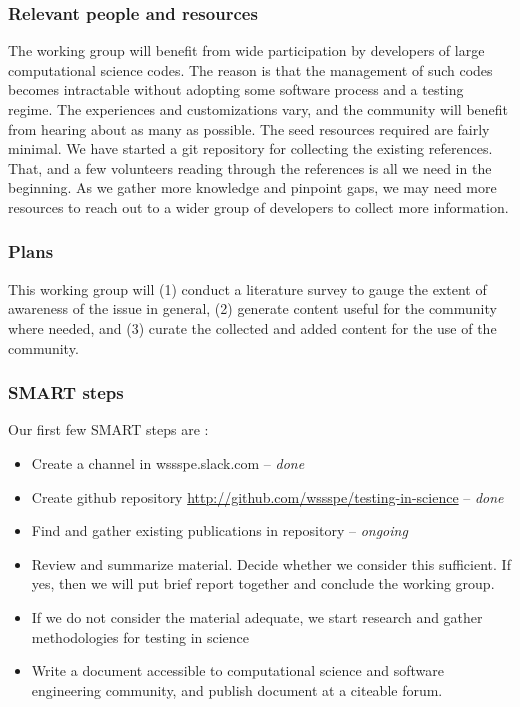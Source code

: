 \subsubsection{Relevant people and resources}

The working group will benefit from wide participation by developers
of large computational science codes. The reason is that the
management of such codes becomes intractable without adopting some
software process and a testing regime. The experiences and
customizations vary, and the community will benefit from hearing about
as many as possible. The seed resources required are fairly
minimal. We have started a git repository for collecting the
existing references. That, and a few volunteers reading through the
references is all we need in the beginning. As we gather more
knowledge and pinpoint gaps, we may need more resources to reach out
to a wider group of developers to collect more information.

\subsubsection{Plans}

This working group will (1) conduct a literature survey to gauge the extent
of awareness of the issue in general, (2) generate content useful for
the community where needed, and (3) curate the collected and added
content for the use of the community.


\subsubsection{SMART steps}

Our first few SMART steps are : 
\begin{itemize}
\item Create a channel in wssspe.slack.com -- {\em done}
\item Create github repository
  {\url{http://github.com/wssspe/testing-in-science}} -- {\em done}
\item Find and gather existing publications in repository -- {\em ongoing}
\item Review and summarize material. Decide whether we consider this
  sufficient. If yes, then we will put brief report together and
  conclude the working group.
\item If we do not consider the material adequate, we start research
  and gather methodologies for testing in science 
\item Write a document accessible to computational science and
  software engineering community, and publish document at a citeable forum.
\end{itemize}

